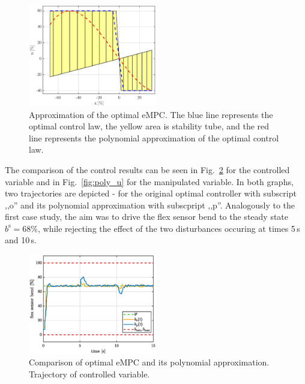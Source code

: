 \documentclass[letterpaper, 10 pt, conference]{ieeeconf}
\begin{document}
\begin{figure}
	\begin{center}
		\includegraphics[width=0.5\textwidth]{images/approximation.eps}
		\caption{Approximation of the optimal eMPC. The blue line represents the optimal control law, the yellow area is stability tube, and the red line represents the polynomial approximation of the optimal control law.}
		\label{fig:approx}
	\end{center}
\end{figure}

The comparison of the control results can be seen in Fig.~\ref{fig:poly_y} for the controlled variable and in Fig.~\ref{fig:poly_u} for the manipulated variable. In both graphs, two trajectories are depicted - for the original optimal controller with subscript ,,o'' and its polynomial approximation with subscpript ,,p''. Analogously to the first case study, the aim was to drive the flex sensor bend to the steady state $ b^\mathrm{s} = 68\%$, while rejecting the effect of the two disturbances occuring at times 5\,s and 10\,s.

\begin{figure}
	\begin{center}
		\includegraphics[width=0.5\textwidth]{images/poly_b.eps}
		\caption{Comparison of optimal eMPC and its polynomial approximation. Trajectory of controlled variable.}
		\label{fig:poly_y}
	\end{center}
\end{figure}
\end{document}
